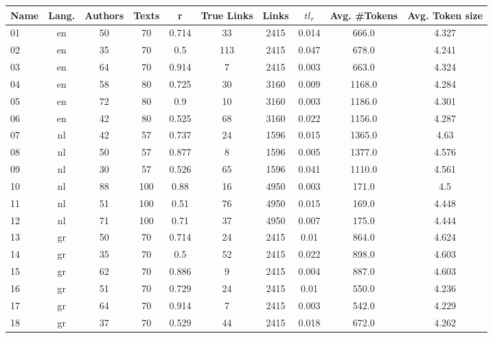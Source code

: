 \begin{table}[H]
  \begin{tabular}{l c c c c c c c c c}
    \toprule
    \textbf{Name} &
    \textbf{Lang.} &
    \textbf{Authors} &
    \textbf{Texts} &
    \textbf{r} &
    \textbf{True Links} &
    \textbf{Links} &
    \textbf{$tl_r$} &
    \textbf{Avg. \#Tokens} &
    \textbf{Avg. Token size} \\
    \midrule
      01 & en & 50 & 70 & 0.714 & 33 & 2415 & 0.014 & 666.0 & 4.327 \\
      02 & en & 35 & 70 & 0.5 & 113 & 2415 & 0.047 & 678.0 & 4.241 \\
      03 & en & 64 & 70 & 0.914 & 7 & 2415 & 0.003 & 663.0 & 4.324 \\
      04 & en & 58 & 80 & 0.725 & 30 & 3160 & 0.009 & 1168.0 & 4.284 \\
      05 & en & 72 & 80 & 0.9 & 10 & 3160 & 0.003 & 1186.0 & 4.301 \\
      06 & en & 42 & 80 & 0.525 & 68 & 3160 & 0.022 & 1156.0 & 4.287 \\
      07 & nl & 42 & 57 & 0.737 & 24 & 1596 & 0.015 & 1365.0 & 4.63 \\
      08 & nl & 50 & 57 & 0.877 & 8 & 1596 & 0.005 & 1377.0 & 4.576 \\
      09 & nl & 30 & 57 & 0.526 & 65 & 1596 & 0.041 & 1110.0 & 4.561 \\
      10 & nl & 88 & 100 & 0.88 & 16 & 4950 & 0.003 & 171.0 & 4.5 \\
      11 & nl & 51 & 100 & 0.51 & 76 & 4950 & 0.015 & 169.0 & 4.448 \\
      12 & nl & 71 & 100 & 0.71 & 37 & 4950 & 0.007 & 175.0 & 4.444 \\
      13 & gr & 50 & 70 & 0.714 & 24 & 2415 & 0.01 & 864.0 & 4.624 \\
      14 & gr & 35 & 70 & 0.5 & 52 & 2415 & 0.022 & 898.0 & 4.603 \\
      15 & gr & 62 & 70 & 0.886 & 9 & 2415 & 0.004 & 887.0 & 4.603 \\
      16 & gr & 51 & 70 & 0.729 & 24 & 2415 & 0.01 & 550.0 & 4.236 \\
      17 & gr & 64 & 70 & 0.914 & 7 & 2415 & 0.003 & 542.0 & 4.229 \\
      18 & gr & 37 & 70 & 0.529 & 44 & 2415 & 0.018 & 672.0 & 4.262 \\
    \bottomrule
  \end{tabular}
\end{table}

